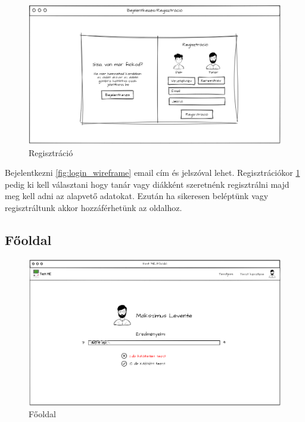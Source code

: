\begin{figure}[H]
    \centering
    \includegraphics[width=\linewidth]{images/signin_wireframe.png}
    \caption{Regisztráció}
    \label{fig:signin_wireframe}
\end{figure}

Bejelentkezni \ref{fig:login_wireframe} email cím és jelszóval lehet. Regisztrációkor \ref{fig:signin_wireframe} pedig ki kell választani hogy tanár vagy diákként szeretnénk regisztrálni majd meg kell adni az alapvető adatokat.
Ezután ha sikeresen beléptünk vagy regisztráltunk akkor hozzáférhetünk az oldalhoz.

\subsection{Főoldal}

\begin{figure}[H]
    \centering
    \includegraphics[width=\linewidth]{images/main_login_wireframe.png}
    \caption{Főoldal}
    \label{fig:main_page}
\end{figure}

